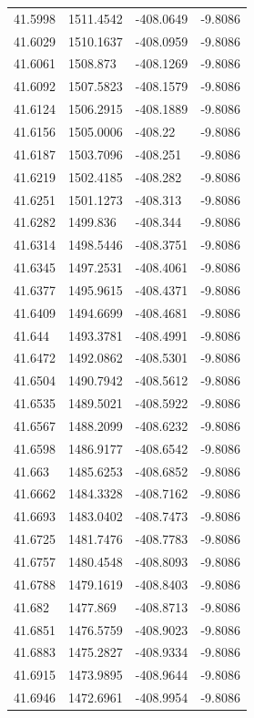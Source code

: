 \begin{table}[H]
\begin{tabular}{llll}
41.5998 & 1511.4542 & -408.0649 & -9.8086 \\
41.6029 & 1510.1637 & -408.0959 & -9.8086 \\
41.6061 & 1508.873 & -408.1269 & -9.8086 \\
41.6092 & 1507.5823 & -408.1579 & -9.8086 \\
41.6124 & 1506.2915 & -408.1889 & -9.8086 \\
41.6156 & 1505.0006 & -408.22 & -9.8086 \\
41.6187 & 1503.7096 & -408.251 & -9.8086 \\
41.6219 & 1502.4185 & -408.282 & -9.8086 \\
41.6251 & 1501.1273 & -408.313 & -9.8086 \\
41.6282 & 1499.836 & -408.344 & -9.8086 \\
41.6314 & 1498.5446 & -408.3751 & -9.8086 \\
41.6345 & 1497.2531 & -408.4061 & -9.8086 \\
41.6377 & 1495.9615 & -408.4371 & -9.8086 \\
41.6409 & 1494.6699 & -408.4681 & -9.8086 \\
41.644 & 1493.3781 & -408.4991 & -9.8086 \\
41.6472 & 1492.0862 & -408.5301 & -9.8086 \\
41.6504 & 1490.7942 & -408.5612 & -9.8086 \\
41.6535 & 1489.5021 & -408.5922 & -9.8086 \\
41.6567 & 1488.2099 & -408.6232 & -9.8086 \\
41.6598 & 1486.9177 & -408.6542 & -9.8086 \\
41.663 & 1485.6253 & -408.6852 & -9.8086 \\
41.6662 & 1484.3328 & -408.7162 & -9.8086 \\
41.6693 & 1483.0402 & -408.7473 & -9.8086 \\
41.6725 & 1481.7476 & -408.7783 & -9.8086 \\
41.6757 & 1480.4548 & -408.8093 & -9.8086 \\
41.6788 & 1479.1619 & -408.8403 & -9.8086 \\
41.682 & 1477.869 & -408.8713 & -9.8086 \\
41.6851 & 1476.5759 & -408.9023 & -9.8086 \\
41.6883 & 1475.2827 & -408.9334 & -9.8086 \\
41.6915 & 1473.9895 & -408.9644 & -9.8086 \\
41.6946 & 1472.6961 & -408.9954 & -9.8086 \\

\end{tabular}
\end{table}
